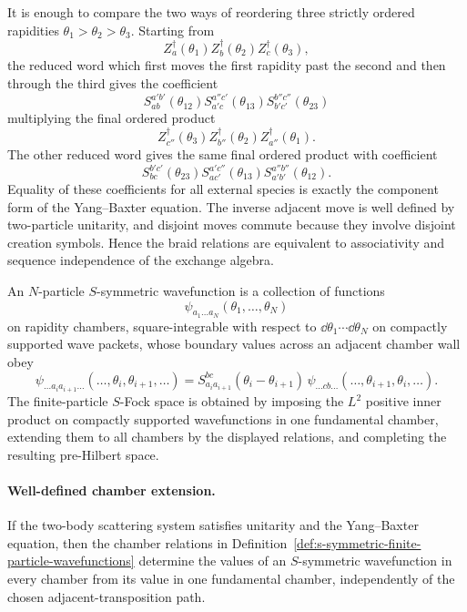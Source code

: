 It is enough to compare the two ways of reordering three strictly ordered
rapidities \(\theta_1>\theta_2>\theta_3\).  Starting from
\[
  Z_a^\dagger(\theta_1)Z_b^\dagger(\theta_2)Z_c^\dagger(\theta_3),
\]
the reduced word which first moves the first rapidity past the second and
then through the third gives the coefficient
\[
  S_{ab}^{a'b'}(\theta_{12})
  S_{a'c}^{a''c'}(\theta_{13})
  S_{b'c'}^{b''c''}(\theta_{23})
\]
multiplying the final ordered product
\[
  Z_{c''}^\dagger(\theta_3)
  Z_{b''}^\dagger(\theta_2)
  Z_{a''}^\dagger(\theta_1).
\]
The other reduced word gives the same final ordered product with coefficient
\[
  S_{bc}^{b'c'}(\theta_{23})
  S_{ac'}^{a'c''}(\theta_{13})
  S_{a'b'}^{a''b''}(\theta_{12}).
\]
Equality of these coefficients for all external species is exactly the
component form of the Yang--Baxter equation.  The inverse adjacent move is
well defined by two-particle unitarity, and disjoint moves commute because
they involve disjoint creation symbols.  Hence the braid relations are
equivalent to associativity and sequence independence of the exchange
algebra.

\begin{definition}
\label{def:s-symmetric-finite-particle-wavefunctions}
An \(N\)-particle \(S\)-symmetric wavefunction is a collection of functions
\[
  \psi_{a_1\ldots a_N}(\theta_1,\ldots,\theta_N)
\]
on rapidity chambers, square-integrable with respect to
\(\dd\theta_1\cdots\dd\theta_N\) on compactly supported wave packets, whose
boundary values across an adjacent chamber wall obey
\[
  \psi_{\ldots a_i a_{i+1}\ldots}
    (\ldots,\theta_i,\theta_{i+1},\ldots)
  =
  S_{a_i a_{i+1}}^{bc}(\theta_i-\theta_{i+1})\,
  \psi_{\ldots c b\ldots}
    (\ldots,\theta_{i+1},\theta_i,\ldots).
\]
The finite-particle \(S\)-Fock space is obtained by imposing the
\(L^2\) positive inner product on compactly supported wavefunctions in one
fundamental chamber, extending them to all chambers by the displayed
relations, and completing the resulting pre-Hilbert space.
\end{definition}

\paragraph{Well-defined chamber extension.}
If the two-body scattering system satisfies unitarity and the Yang--Baxter
equation, then
the chamber relations in
Definition~\ref{def:s-symmetric-finite-particle-wavefunctions} determine the
values of an \(S\)-symmetric wavefunction in every chamber from its value in
one fundamental chamber, independently of the chosen adjacent-transposition
path.

